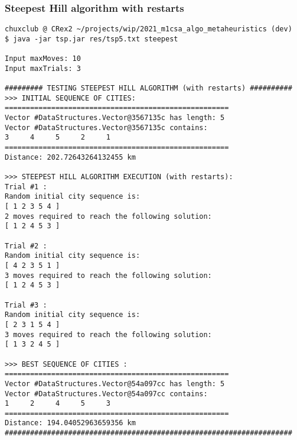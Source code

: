 \documentclass[./standalone.tex]{subfiles}
\begin{document}
	\subsubsection{Steepest Hill algorithm with restarts}
	\begin{lstlisting}[style=Java, caption={Bash output of the execution of the steepest hill algorithm on the tsp5.txt instance}]
chuxclub @ CRex2 ~/projects/wip/2021_m1csa_algo_metaheuristics (dev)
$ java -jar tsp.jar res/tsp5.txt steepest

Input maxMoves: 10
Input maxTrials: 3

######### TESTING STEEPEST HILL ALGORITHM (with restarts) ########## 
>>> INITIAL SEQUENCE OF CITIES: 
===================================================== 
Vector #DataStructures.Vector@3567135c has length: 5
Vector #DataStructures.Vector@3567135c contains: 
3     4     5     2     1 
===================================================== 
Distance: 202.72643264132455 km

>>> STEEPEST HILL ALGORITHM EXECUTION (with restarts): 
Trial #1 :
Random initial city sequence is: 
[ 1 2 3 5 4 ]
2 moves required to reach the following solution:
[ 1 2 4 5 3 ]

Trial #2 :
Random initial city sequence is: 
[ 4 2 3 5 1 ]
3 moves required to reach the following solution:
[ 1 2 4 5 3 ]

Trial #3 :
Random initial city sequence is: 
[ 2 3 1 5 4 ]
3 moves required to reach the following solution:
[ 1 3 2 4 5 ]

>>> BEST SEQUENCE OF CITIES : 
===================================================== 
Vector #DataStructures.Vector@54a097cc has length: 5
Vector #DataStructures.Vector@54a097cc contains: 
1     2     4     5     3 
===================================================== 
Distance: 194.04052963659356 km
####################################################################
	\end{lstlisting}

\newpage
\end{document}
